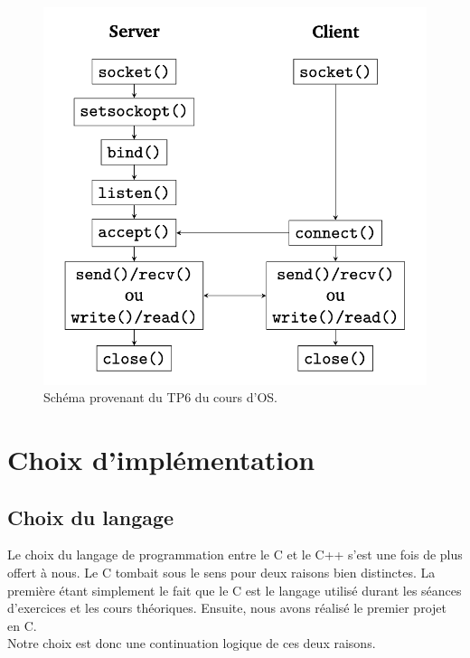 \documentclass[utf8]{article}
\begin{document}
\begin{figure}[h]
    \centering
    \includegraphics[scale=0.7]{server.png}
    \caption{Schéma provenant du TP6 du cours d'OS.}
\end{figure}

\section{Choix d'implémentation}
\subsection{Choix du langage}
Le choix du langage de programmation entre le C et le C++ s'est une fois de plus offert à nous. Le C tombait sous le sens pour deux raisons bien distinctes. 
La première étant simplement le fait que le C est le langage utilisé durant les séances d'exercices et les cours théoriques. Ensuite, nous avons réalisé le premier projet en C. \\
Notre choix est donc une continuation logique de ces deux raisons.
\end{document}
